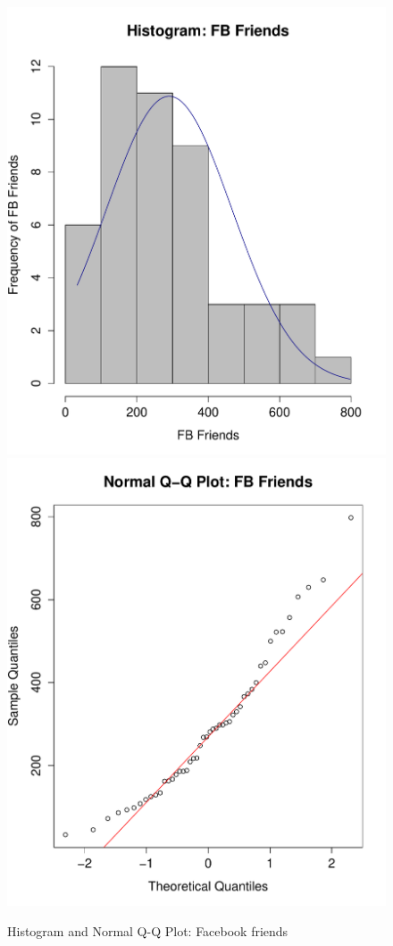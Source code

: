 \begin{figure}[H]
\caption{Histogram and Normal Q-Q Plot: Facebook friends}
\centering
\includegraphics[scale=0.35]{./img/hist_fbfriends.pdf}
\includegraphics[scale=0.35]{./img/qqplot_fbfriends.pdf}
\end{figure}

